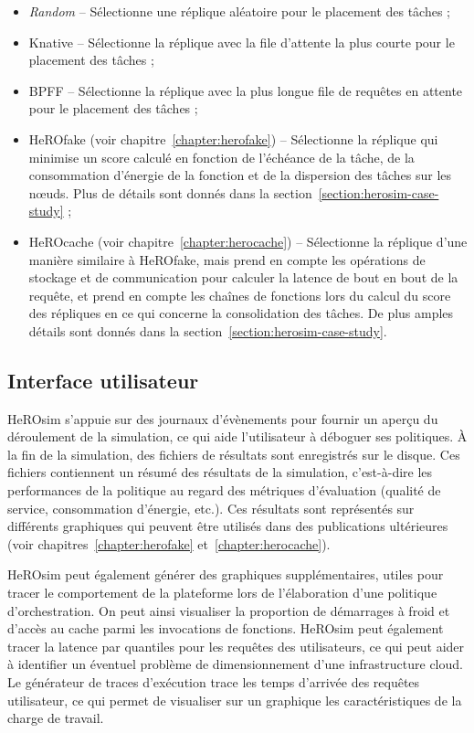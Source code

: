 \begin{itemize}
    \item \textit{Random} -- Sélectionne une réplique aléatoire pour le placement des tâches ;
    \item Knative -- Sélectionne la réplique avec la file d'attente la plus courte pour le placement des tâches ;
    \item \gls{BPFF} -- Sélectionne la réplique avec la plus longue file de requêtes en attente pour le placement des tâches ;
    \item HeROfake (voir chapitre~\ref{chapter:herofake}) -- Sélectionne la réplique qui minimise un score calculé en fonction de l'échéance de la tâche, de la consommation d'énergie de la fonction et de la dispersion des tâches sur les nœuds. Plus de détails sont donnés dans la section~\ref{section:herosim-case-study} ;
    \item HeROcache (voir chapitre~\ref{chapter:herocache}) -- Sélectionne la réplique d'une manière similaire à HeROfake, mais prend en compte les opérations de stockage et de communication pour calculer la latence de bout en bout de la requête, et prend en compte les chaînes de fonctions lors du calcul du score des répliques en ce qui concerne la consolidation des tâches. De plus amples détails sont donnés dans la section~\ref{section:herosim-case-study}.
\end{itemize}

\subsection{Interface utilisateur}

HeROsim s'appuie sur des journaux d'évènements pour fournir un aperçu du déroulement de la simulation, ce qui aide l'utilisateur à déboguer ses politiques. À la fin de la simulation, des fichiers de résultats sont enregistrés sur le disque. Ces fichiers contiennent un résumé des résultats de la simulation, c'est-à-dire les performances de la politique au regard des métriques d'évaluation (qualité de service, consommation d'énergie, etc.). Ces résultats sont représentés sur différents graphiques qui peuvent être utilisés dans des publications ultérieures (voir chapitres~\ref{chapter:herofake} et~\ref{chapter:herocache}).

HeROsim peut également générer des graphiques supplémentaires, utiles pour tracer le comportement de la plateforme lors de l'élaboration d'une politique d'orchestration. On peut ainsi visualiser la proportion de démarrages à froid et d'accès au cache parmi les invocations de fonctions. HeROsim peut également tracer la latence par quantiles pour les requêtes des utilisateurs, ce qui peut aider à identifier un éventuel problème de dimensionnement d'une infrastructure cloud. Le générateur de traces d'exécution trace les temps d'arrivée des requêtes utilisateur, ce qui permet de visualiser sur un graphique les caractéristiques de la charge de travail.

